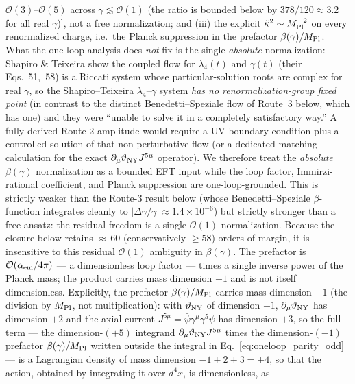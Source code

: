 \documentclass[aps,prd,twocolumn,superscriptaddress,showpacs,preprintnumbers,nofootinbib,longbibliography,floatfix]{revtex4-2}
\begin{document}
$\mathcal{O}(3)$--$\mathcal{O}(5)$ across $\gamma\lesssim\mathcal{O}(1)$
(the ratio is bounded below by $378/120\approx3.2$ for all real
$\gamma$)],
not a free normalization; and (iii) the explicit
$\tilde\kappa^2\sim M_{\rm Pl}^{-2}$ on every renormalized charge, i.e.\ the
Planck suppression in the prefactor $\beta(\gamma)/M_{\rm Pl}$. What the
one-loop analysis does \emph{not} fix is the single \emph{absolute}
normalization: Shapiro \& Teixeira show the coupled flow for
$\lambda_4(t)$ and $\gamma(t)$ (their Eqs.~51,~58) is a Riccati system
whose particular-solution roots are complex for real $\gamma$, so the
Shapiro--Teixeira $\lambda_4$--$\gamma$ system \emph{has no
renormalization-group fixed point} (in contrast to the distinct
Benedetti--Speziale flow of Route~3 below, which has one) and they were
``unable to solve it in a completely satisfactory way.'' A
fully-derived Route-2 amplitude would require a UV boundary condition
plus a controlled solution of that non-perturbative flow (or a
dedicated matching calculation for the exact
$\partial_\mu\vartheta_{\rm NY}J^{5\mu}$ operator). We therefore treat
the \emph{absolute} $\beta(\gamma)$ normalization as a bounded EFT input
while the loop factor, Immirzi-rational coefficient, and Planck
suppression are one-loop-grounded. This is strictly weaker than the
Route-3 result below (whose Benedetti--Speziale $\beta$-function
integrates cleanly to $|\Delta\gamma/\gamma|\approx1.4\times10^{-6}$)
but strictly stronger than a free ansatz: the residual freedom is a
single $\mathcal{O}(1)$ normalization. Because
the closure below retains ${\approx}\,60$ (conservatively $\geq 58$)
orders of margin, it is insensitive to this residual $\mathcal{O}(1)$
ambiguity in $\beta(\gamma)$.
The prefactor is $\mathcal{O}(\alpha_{\rm em}/4\pi)$ --- a dimensionless
loop factor --- times a single inverse power of the Planck mass;
the product carries mass dimension $-1$ and is not itself
dimensionless. Explicitly, the
prefactor $\beta(\gamma)/M_{\rm Pl}$ carries mass dimension $-1$ (the
division by $M_{\rm Pl}$, not multiplication): with $\vartheta_{\rm NY}$ of
dimension $+1$, $\partial_\mu\vartheta_{\rm NY}$ has dimension $+2$ and the
axial current $J^{5\mu}=\bar\psi\gamma^\mu\gamma^5\psi$ has dimension $+3$,
so the full term --- the dimension-$(+5)$ integrand
$\partial_\mu\vartheta_{\rm NY}J^{5\mu}$ times the dimension-$(-1)$
prefactor $\beta(\gamma)/M_{\rm Pl}$ written outside the integral in
Eq.~\eqref{eq:oneloop_parity_odd} ---
is a Lagrangian density of mass dimension $-1+2+3=+4$, so that the
action, obtained by integrating it over $d^4x$, is dimensionless, as
\end{document}

